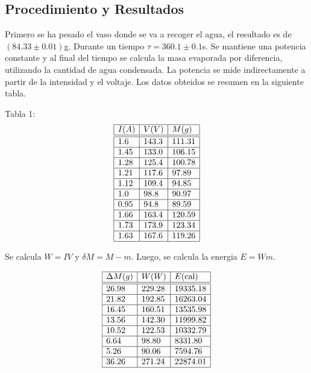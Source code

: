 \documentclass{article}
\begin{document}
\begin{multicols}{2}
\section*{Procedimiento y Resultados}
Primero se ha pesado el vaso donde se va a recoger el agua, el resultado es de $(84.33\pm0.01)$g. Durante un tiempo $\tau=360.1\pm0.1$s. Se mantiene una potencia constante y al final del tiempo se calcula la masa evaporada por diferencia, utilizando la cantidad de agua condensada. La potencia se mide indirectamente a partir de la intensidad y el voltaje. Los datos obteidos se resumen en la siguiente tabla.
\begin{center}
  Tabla 1:
  $$
  \begin{array}{|l|l|l|} \hline
    I(A) & V(V) & M(g) \\ \hline \hline
    1.6 & 143.3 & 111.31  \\ \hline
    1.45 & 133.0 & 106.15  \\ \hline
    1.28 & 125.4 & 100.78  \\ \hline
    1.21 & 117.6 & 97.89  \\ \hline
    1.12 & 109.4 & 94.85  \\ \hline
    1.0 & 98.8 & 90.97  \\ \hline
    0.95 & 94.8 & 89.59  \\ \hline
    1.66 & 163.4 & 120.59  \\ \hline
    1.73 & 173.9 & 123.34  \\ \hline
    1.63 & 167.6 & 119.26  \\ \hline
    \end{array}
  $$
\end{center}
Se calcula $W = I V$ y $\delta M = M- m$. Luego, se calcula la energia $E= Wm$.
\begin{center}
  $$
  \begin{array}{|l|l|l|} \hline
    \Delta M(g) & W(W )& E(\text{cal}) \\ \hline \hline
      26.98 & 229.28 & 19335.18  \\ \hline
      21.82 & 192.85 & 16263.04  \\ \hline
      16.45 & 160.51 & 13535.98  \\ \hline
      13.56 & 142.30 & 11999.82  \\ \hline
      10.52 & 122.53 & 10332.79  \\ \hline
      6.64  & 98.80  & 8331.80   \\ \hline
      5.26  & 90.06  & 7594.76   \\ \hline
      36.26 & 271.24 & 22874.01  \\ \hline

\end{array}$$
\end{center}
\end{multicols}
\end{document}
